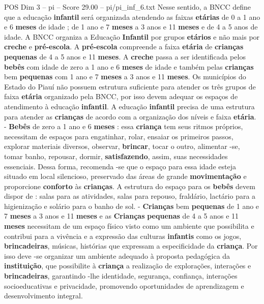 \begin{textsample}{POS Dim 3 – pi – Score 29.00 – pi/pi\_inf\_6.txt}
Nesse sentido, a BNCC define que a educação \textbf{infantil} será organizada atendendo as faixas \textbf{etárias} de 0 a 1 ano e 6 \textbf{meses} de idade ; de 1 ano e 7 \textbf{meses} a 3 anos e 11 \textbf{meses} e de 4 a 5 anos de idade.
A BNCC organiza a Educação \textbf{Infantil} por grupos \textbf{etários} e não mais por \textbf{creche} e \textbf{pré-escola}.
A \textbf{pré-escola} compreende a faixa \textbf{etária} de \textbf{crianças} \textbf{pequenas} de 4 a 5 anos e 11 \textbf{meses}.
A \textbf{creche} passa a ser identificada pelos \textbf{bebês} com idade de zero a 1 ano e 6 \textbf{meses} de idade e também pelas \textbf{crianças} bem \textbf{pequenas} com 1 ano e 7 \textbf{meses} a 3 anos e 11 \textbf{meses}.
Os municípios do Estado do Piauí não possuem estrutura suficiente para atender os três grupos de faixa \textbf{etária} organizado pela BNCC, por isso devem adequar os espaços de atendimento à educação \textbf{infantil}.
A educação \textbf{infantil} precisa de uma estrutura para atender as \textbf{crianças} de acordo com a organização dos níveis e faixa \textbf{etária}. - \textbf{Bebês} de zero a 1 ano e 6 \textbf{meses} : essa \textbf{criança} tem seus ritmos próprios, necessitam de espaços para engatinhar, rolar, ensaiar os primeiros passos, explorar materiais diversos, observar, \textbf{brincar}, tocar o outro, alimentar -se, tomar banho, repousar, dormir, \textbf{satisfazendo}, assim, suas necessidades essenciais.
Dessa forma, recomenda -se que o espaço para essa idade esteja situado em local silencioso, preservado das áreas de grande \textbf{movimentação} e proporcione \textbf{conforto} às \textbf{crianças}.
A estrutura do espaço para os \textbf{bebês} devem dispor de : salas para as atividades, salas para repouso, fraldário, lactário para a higienização e solário para o banho de sol. - \textbf{Crianças} bem \textbf{pequenas} de 1 ano e 7 \textbf{meses} a 3 anos e 11 \textbf{meses} e as \textbf{Crianças} \textbf{pequenas} de 4 a 5 anos e 11 \textbf{meses} necessitam de um espaço físico visto como um ambiente que possibilita e contribui para a vivência e a expressão das culturas \textbf{infantis} como os jogos, \textbf{brincadeiras}, músicas, histórias que expressam a especificidade da \textbf{criança}.
Por isso deve -se organizar um ambiente adequado à proposta pedagógica da \textbf{instituição}, que possibilite à \textbf{criança} a realização de explorações, interações e \textbf{brincadeiras}, garantindo -lhe identidade, segurança, confiança, interações socioeducativas e privacidade, promovendo oportunidades de aprendizagem e desenvolvimento integral.

\end{textsample}
